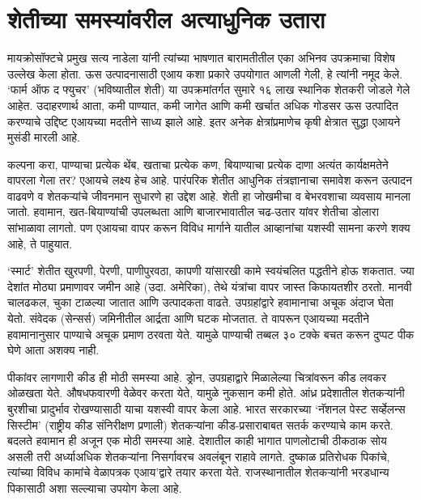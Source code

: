 \chapter{शेतीच्या समस्यांवरील अत्याधुनिक उतारा}

मायक्रोसॉफ्टचे प्रमुख सत्य नाडेला यांनी त्यांच्या भाषणात बारामतीतील एका अभिनव उपक्रमाचा विशेष उल्लेख केला होता. ऊस उत्पादनासाठी एआय कशा प्रकारे उपयोगात आणली गेली, हे त्यांनी नमूद केले. `फार्म ऑफ द फ्युचर' (भविष्यातील शेती) या उपक्रमांतर्गत सुमारे १६ लाख स्थानिक शेतकरी जोडले गेले आहेत. उदाहरणार्थ आता, कमी पाण्यात, कमी जागेत आणि कमी खर्चात अधिक गोडसर ऊस उत्पादित करण्याचे उद्दिष्ट एआयच्या मदतीने साध्य झाले आहे. इतर अनेक क्षेत्रांप्रमाणेच कृषी क्षेत्रात सुद्धा एआयने मुसंडी मारली आहे.

कल्पना करा, पाण्याचा प्रत्येक थेंब, खताचा प्रत्येक कण, बियाण्याचा प्रत्येक दाणा अत्यंत कार्यक्षमतेने वापरला गेला तर? एआयचे लक्ष्य हेच आहे. पारंपरिक शेतीत आधुनिक तंत्रज्ञानाचा समावेश करून उत्पादन वाढवणे व शेतकऱ्यांचे जीवनमान सुधारणे हा उद्देश आहे. शेती हा जोखमीचा व बेभरवशाचा व्यवसाय मानला जातो. हवामान, खत-बियाण्यांची उपलब्धता आणि बाजारभावातील चढ-उतार यांवर शेतीचा डोलारा सांभाळावा लागतो. पण एआयचा वापर करून विविध मार्गाने यातील  आव्हानांचा यशस्वी सामना करणे शक्य आहे, ते पाहुयात.

`स्मार्ट' शेतीत खुरपणी, पेरणी, पाणीपुरवठा, कापणी यांसारखी कामे स्वयंचलित पद्धतीने होऊ शकतात. ज्या देशांत मोठ्या प्रमाणावर जमीन आहे (उदा. अमेरिका), तेथे यंत्रांचा वापर जास्त किफायतशीर ठरतो. मानवी चालढकल, चुका टाळल्या जातात आणि उत्पादकता वाढते. उपग्रहांद्वारे हवामानाचा अचूक अंदाज घेता येतो. संवेदक (सेन्सर्स) जमिनीतील आर्द्रता आणि घटक मोजतात. ते वापरून एआयच्या मदतीने हवामानानुसार पाण्याचे अचूक प्रमाण ठरवता येते. यामुळे पाण्याची तब्बल ३० टक्के बचत करून दुप्पट पीक घेणे आता अशक्य नाही.

पीकांवर लागणारी कीड ही मोठी समस्या आहे. ड्रोन, उपग्रहाद्वारे मिळालेल्या चित्रांवरून कीड लवकर ओळखता येते. औषधफवारणी वेळेवर करता येते, यामुळे नुकसान कमी होते. आंध्र प्रदेशातील शेतकऱ्यांनी बुरशीचा प्रादुर्भाव रोखण्यासाठी याचा यशस्वी वापर केला आहे. भारत सरकारच्या `नॅशनल पेस्ट सर्व्हेलन्स सिस्टीम' (राष्ट्रीय कीड संनिरीक्षण प्रणाली) शेतकऱ्यांना कीड-प्रसाराबाबत सतर्क करण्याचे काम करते. बदलते हवामान ही अजून एक मोठी समस्या आहे. देशातील काही भागात पाणलोटाची ठीकठाक सोय असली तरी अर्ध्याअधिक शेतकऱ्यांना निसर्गावरच अवलंबून राहावे लागते. दुष्काळ प्रतिरोधक पिकांचे, त्यांच्या विविध कामांचे वेळापत्रक एआय'द्वारे तयार करता येते. राजस्थानातील शेतकऱ्यांनी भरडधान्य पिकासाठी अशा सल्ल्याचा उपयोग केला आहे.

